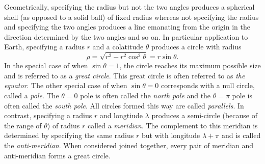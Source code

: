 \documentclass[11pt,dvipsnames]{thesis}
\begin{document}
Geometrically, specifying the radius but not the two angles produces a spherical shell (as opposed to a solid ball) of fixed radius whereas not specifying the radius and specifying the two angles produces a line emanating from the origin in the direction determined by the two angles and so on. In particular application to Earth, specifying a radius $r$ and a colatitude $\theta$ produces a circle with radius
\begin{equation}
\rho = \sqrt{r^2 - r^2\cos^2\theta} = r\sin\theta.
\end{equation}
In the special case of when $\sin\theta = 1$, the circle reaches its maximum possible size and is referred to as a \textit{great circle}. This great circle is often referred to as \textit{the equator}. The other special case of when $\sin\theta = 0$ corresponds with a null circle, called a \textit{pole}. The $\theta = 0$ pole is often called the \textit{north pole} and the $\theta = \pi$ pole is often called the \textit{south pole}. All circles formed this way are called \textit{parallels}. In contrast, specifying a radius $r$ and longtiude $\lambda$ produces a semi-circle (because of the range of $\theta$) of radius $r$ called a \textit{meridian}. The complement to this meridian is determined by specifying the same radius $r$ but with longitude $\lambda + \pi$ and is called the \textit{anti-meridian}. When considered joined together, every pair of meridian and anti-meridian forms a great circle.
\end{document}
